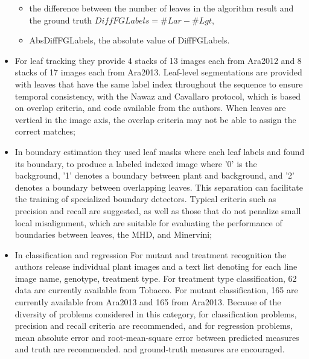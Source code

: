 \begin{itemize}
\begin{itemize}
\item the difference between the number of leaves in the algorithm result and the ground truth $DiffFGLabels = \#Lar - \#Lgt$,
\item AbsDiffFGLabels, the absolute value of DiffFGLabels.
\end{itemize}
\item For leaf tracking they provide 4 stacks of 13 images each from Ara2012 and 8 stacks of 17 images each from Ara2013. Leaf-level segmentations are provided
with leaves that have the same label index throughout the sequence to ensure temporal consistency, with the Nawaz and Cavallaro protocol, which is based on overlap
criteria, and code available from the authors. When leaves are vertical in the image axis, the overlap criteria may not be able to assign the correct matches;
\item In boundary estimation they used leaf masks where each leaf labels and found its boundary, to produce a labeled indexed image where '0' is the background,
'1' denotes a boundary between plant and background, and '2' denotes a boundary between overlapping leaves. This separation can facilitate the training of specialized
boundary detectors. Typical criteria such as precision and recall are suggested, as well as those that do not penalize small local misalignment, which are suitable for
evaluating the performance of boundaries between leaves, the MHD, and Minervini;
\item In classification and regression For mutant and treatment recognition the authors release individual plant images and a text list denoting for each line image name,
genotype, treatment type. For treatment type classification, 62 data are currently available from Tobacco. For mutant classification, 165 are currently available
from Ara2013 and 165 from Ara2013. Because of the diversity of problems considered in this category, for classification problems, precision and recall criteria are
recommended, and for regression problems, mean absolute error and root-mean-square error between predicted measures and truth are recommended. and ground-truth measures
are encouraged.
\end{itemize}

